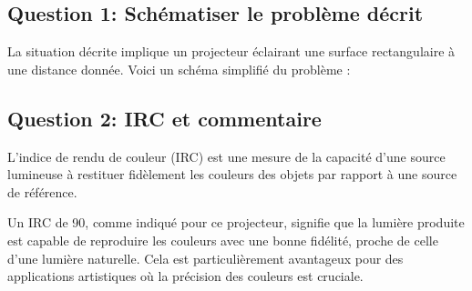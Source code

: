 \documentclass[answers]{exam}
\begin{document}
    \begin{solution}

\subsection*{Question 1: Schématiser le problème décrit}

\begin{questions}
La situation décrite implique un projecteur éclairant une surface rectangulaire à une distance donnée. Voici un schéma simplifié du problème :

\begin{center}
\end{center}

\end{questions}

\subsection*{Question 2: IRC et commentaire}

\begin{questions}
\begin{compactitem}
    \item L’indice de rendu de couleur (IRC) est une mesure de la capacité d'une source lumineuse à restituer fidèlement les couleurs des objets par rapport à une source de référence. 
    \item Un IRC de 90, comme indiqué pour ce projecteur, signifie que la lumière produite est capable de reproduire les couleurs avec une bonne fidélité, proche de celle d'une lumière naturelle. Cela est particulièrement avantageux pour des applications artistiques où la précision des couleurs est cruciale.
\end{compactitem}
\end{questions}


\end{solution}
\end{document}
